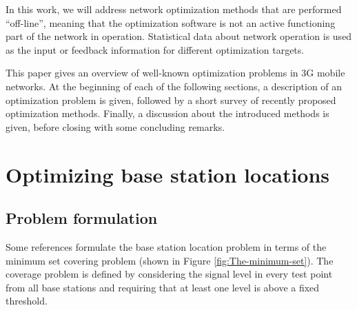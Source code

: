 In this work, we will address network optimization methods that are
performed ``off-line'', meaning that the optimization software is
not an active functioning part of the network in operation. Statistical
data about network operation is used as the input or feedback information
for different optimization targets.

This paper gives an overview of well-known optimization problems in
3G mobile networks. At the beginning of each of the following sections,
a description of an optimization problem is given, followed by a short
survey of recently proposed optimization methods. Finally, a discussion
about the introduced methods is given, before closing with some concluding
remarks.


\section{Optimizing base station locations}


\subsection{Problem formulation}

Some references \cite{minimum.set.covering.problem:1997,minimum.set.covering.problem:1998,minimum.set.covering.problem:2000}
formulate the base station location problem in terms of the minimum
set covering problem (shown in Figure \ref{fig:The-minimum-set}).
The coverage problem is defined by considering the signal level in
every test point from all base stations and requiring that at least
one level is above a fixed threshold.


